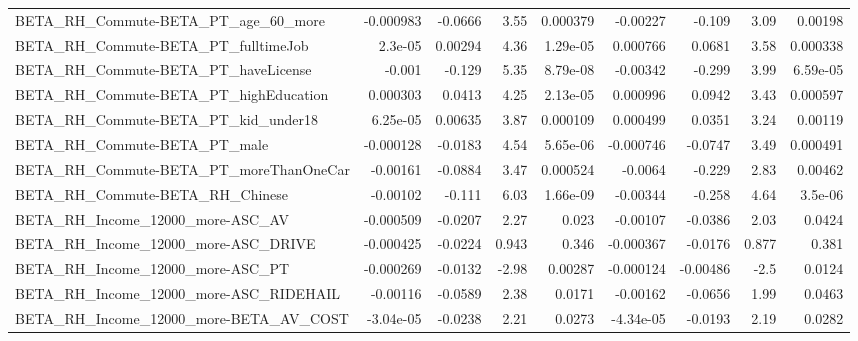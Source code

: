 \begin{tabular}{lrrrrrrrr}
BETA\_RH\_Commute-BETA\_PT\_age\_60\_more                &   -0.000983 &      -0.0666 &     3.55 & 0.000379 &   -0.00227 &      -0.109 &         3.09 &       0.00198 \\
BETA\_RH\_Commute-BETA\_PT\_fulltimeJob                &     2.3e-05 &      0.00294 &     4.36 & 1.29e-05 &   0.000766 &      0.0681 &         3.58 &      0.000338 \\
BETA\_RH\_Commute-BETA\_PT\_haveLicense                &      -0.001 &       -0.129 &     5.35 & 8.79e-08 &   -0.00342 &      -0.299 &         3.99 &      6.59e-05 \\
BETA\_RH\_Commute-BETA\_PT\_highEducation              &    0.000303 &       0.0413 &     4.25 & 2.13e-05 &   0.000996 &      0.0942 &         3.43 &      0.000597 \\
BETA\_RH\_Commute-BETA\_PT\_kid\_under18                &    6.25e-05 &      0.00635 &     3.87 & 0.000109 &   0.000499 &      0.0351 &         3.24 &       0.00119 \\
BETA\_RH\_Commute-BETA\_PT\_male                       &   -0.000128 &      -0.0183 &     4.54 & 5.65e-06 &  -0.000746 &     -0.0747 &         3.49 &      0.000491 \\
BETA\_RH\_Commute-BETA\_PT\_moreThanOneCar             &    -0.00161 &      -0.0884 &     3.47 & 0.000524 &    -0.0064 &      -0.229 &         2.83 &       0.00462 \\
BETA\_RH\_Commute-BETA\_RH\_Chinese                    &    -0.00102 &       -0.111 &     6.03 & 1.66e-09 &   -0.00344 &      -0.258 &         4.64 &       3.5e-06 \\
BETA\_RH\_Income\_12000\_more-ASC\_AV                   &   -0.000509 &      -0.0207 &     2.27 &    0.023 &   -0.00107 &     -0.0386 &         2.03 &        0.0424 \\
BETA\_RH\_Income\_12000\_more-ASC\_DRIVE                &   -0.000425 &      -0.0224 &    0.943 &    0.346 &  -0.000367 &     -0.0176 &        0.877 &         0.381 \\
BETA\_RH\_Income\_12000\_more-ASC\_PT                   &   -0.000269 &      -0.0132 &    -2.98 &  0.00287 &  -0.000124 &    -0.00486 &         -2.5 &        0.0124 \\
BETA\_RH\_Income\_12000\_more-ASC\_RIDEHAIL             &    -0.00116 &      -0.0589 &     2.38 &   0.0171 &   -0.00162 &     -0.0656 &         1.99 &        0.0463 \\
BETA\_RH\_Income\_12000\_more-BETA\_AV\_COST             &   -3.04e-05 &      -0.0238 &     2.21 &   0.0273 &  -4.34e-05 &     -0.0193 &         2.19 &        0.0282 \\

\end{tabular}
